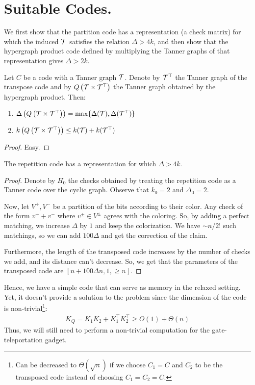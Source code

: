 \documentclass[manuscript,screen,review]{acmart}
\begin{document}
\section{Suitable Codes.}  
We first show that the partition code has a representation (a check matrix) for which the induced $\mathcal{T}$ satisfies the relation $\Delta > 4k$, and then show that the hypergraph product code defined by multiplying the Tanner graphs of that representation gives $\Delta > 2k$.

\begin{claim}
Let $C$ be a code with a Tanner graph $\mathcal{T}$. Denote by $\mathcal{T}^\top$ the Tanner graph of the transpose code and by $Q\left(\mathcal{T} \times \mathcal{T}^\top\right)$ the Tanner graph obtained by the hypergraph product. Then:
  \begin{enumerate}
    \item $ \Delta\left(Q\left(\mathcal{T} \times \mathcal{T}^\top\right)\right) = \max \{  \Delta(\mathcal{T}), \Delta(\mathcal{T}^{\top}) \} $ 
    \item $ k\left(Q\left(\mathcal{T} \times \mathcal{T}^\top\right)\right) \le  k(\mathcal{T}) + k(\mathcal{T}^{\top})$ 
  \end{enumerate}
\end{claim}

\begin{proof} Easy.
\end{proof}

\begin{claim}
The repetition code has a representation for which $\Delta > 4k$.
\end{claim}
\begin{proof}
Denote by $H_{0}$ the checks obtained by treating the repetition code as a Tanner code over the cyclic graph. Observe that $k_{0} = 2$ and $\Delta_{0} = 2$.

Now, let $V^{+}, V^{-}$ be a partition of the bits according to their color. Any check of the form $v^{+} + v^{-}$ where $v^{\pm} \in V^{\pm}$ agrees with the coloring. So, by adding a perfect matching, we increase $\Delta$ by $1$ and keep the colorization. We have $\sim n/2!$ such matchings, so we can add $100\Delta$ and get the correction of the claim.

Furthermore, the length of the transposed code increases by the number of checks we add, and its distance can't decrease. So, we get that the parameters of the transposed code are $[n + 100\Delta n, 1, \ge n]$.

\end{proof}

Hence, we have a simple code that can serve as memory in the relaxed setting. Yet, it doesn't provide a solution to the problem since the dimension of the code is non-trivial\footnote{Can be decreased to $ \Theta( \sqrt{n}) $ if we choose $C_1 = C$ and $C_{2}$ to be the transposed code instead of choosing $C_{1} = C_{2} = C$.}:
\begin{equation*}
  \begin{split}
    K_{Q} = K_{1}K_{2} + K_{1}^\top K_{2}^{\top} \ge O(1) + \Theta(n)
  \end{split}
\end{equation*}
Thus, we will still need to perform a non-trivial computation for the gate-teleportation gadget.
\end{document}
